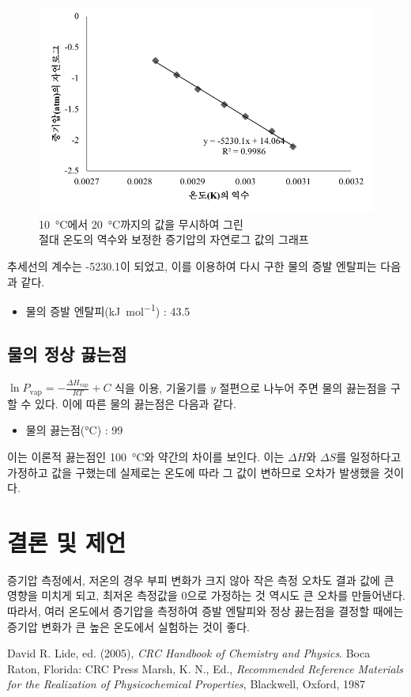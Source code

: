 \documentclass[a4paper,10pt]{article}
\begin{document}
	\begin{figure}[ht]
		\centering
		\includegraphics[scale=1]{Book3_3.pdf}
		\caption{\SI{10}{\degreeCelsius}에서 \SI{20}{\degreeCelsius}까지의 값을 무시하여 그린\\절대 온도의 역수와 보정한 증기압의 자연로그 값의 그래프}
		\label{exp_graph_3}
	\end{figure}
	
	추세선의 계수는 -5230.1이 되었고, 이를 이용하여 다시 구한 물의 증발 엔탈피는 다음과 같다.
	\begin{itemize}
		\item 물의 증발 엔탈피(\si{\kilo\joule\per\mole}) : 43.5
	\end{itemize}
	
	\subsection{물의 정상 끓는점}
	$\ln P_{\mathrm{vap}} = -\frac{\Delta H_{\mathrm{vap}}}{RT} + C$ 식을 이용, 기울기를 $y$ 절편으로 나누어 주면 물의 끓는점을 구할 수 있다. 이에 따른 물의 끓는점은 다음과 같다.
	\begin{itemize}
		\item 물의 끓는점(\si{\degreeCelsius}) : 99
	\end{itemize}
	이는 이론적 끓는점인 \SI{100}{\degreeCelsius}와 약간의 차이를 보인다. 이는 $\Delta H$와 $\Delta S$를 일정하다고 가정하고 값을 구했는데 실제로는 온도에 따라 그 값이 변하므로 오차가 발생했을 것이다.
	
	\section{결론 및 제언}
	증기압 측정에서, 저온의 경우 부피 변화가 크지 않아 작은 측정 오차도 결과 값에 큰 영향을 미치게 되고, 최저온 측정값을 0으로 가정하는 것 역시도 큰 오차를 만들어낸다. 따라서, 여러 온도에서 증기압을 측정하여 증발 엔탈피와 정상 끓는점을 결정할 때에는 증기압 변화가 큰 높은 온도에서 실험하는 것이 좋다.
	
	
	\begin{thebibliography}{00}
		 David R. Lide, ed. (2005), \textit{CRC Handbook of Chemistry and Physics}. Boca Raton, Florida: CRC Press
		 Marsh, K. N., Ed., \textit{Recommended Reference Materials for the Realization of Physicochemical Properties}, Blackwell, Oxford, 1987 %
	\end{thebibliography}
			
\end{document}
